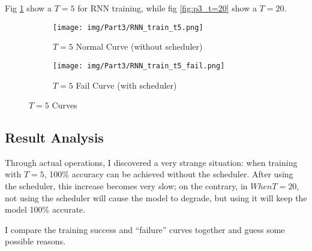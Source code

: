 Fig \ref{fig:p3_t=5} show a $T=5$ for RNN training, while fig \ref{fig:p3_t=20} show a $T=20$.

\begin{figure}[!htbp]
  \centering
  \begin{subfigure}[b]{1\textwidth}
    \texttt{[image: img/Part3/RNN\_train\_t5.png]}
    \caption{$T=5$ Normal Curve (without scheduler)}
  \end{subfigure}
  \begin{subfigure}[b]{1\textwidth}
    \texttt{[image: img/Part3/RNN\_train\_t5\_fail.png]}
    \caption{$T=5$ Fail Curve (with scheduler)}
  \end{subfigure}
  \caption{$T=5$ Curves}
  \label{fig:p3_t=5}
\end{figure}

\subsection{Result Analysis}

Through actual operations, I discovered a very strange situation: when training with $T=5$, 100\% accuracy can be achieved without the scheduler.
After using the scheduler, this increase becomes very slow; on the contrary, in $ When T=20$, not using the scheduler will cause the model to degrade, but using it will keep the model 100\% accurate.

I compare the training success and ``failure'' curves together and guess some possible reasons.

